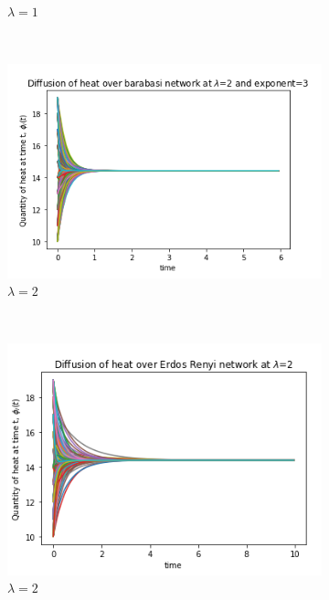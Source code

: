 \documentclass[10pt,a4paper]{article}
\begin{document}
\begin{enumerate}[i)]
\begin{figure}[H]
\begin{subfigure}[b]{0.45\textwidth}
    	    			\caption{$\lambda=1$}
    	    		\end{subfigure}\\
    	    		\begin{subfigure}[b]{0.45\textwidth}
    	    			\includegraphics[width= \textwidth]{images/BA-lam2-laplace.png}
    	    			\caption{$\lambda=2$}
    	    		\end{subfigure}~
    	    		\begin{subfigure}[b]{0.45\textwidth}
    	    			\includegraphics[width= \textwidth]{images/ER-lam2-laplace.png}
    	    			\caption{$\lambda=2$}
    	    		\end{subfigure}\\
    	    		\begin{subfigure}[b]{0.45\textwidth}

\end{subfigure}
\end{figure}
\end{enumerate}
\end{document}
